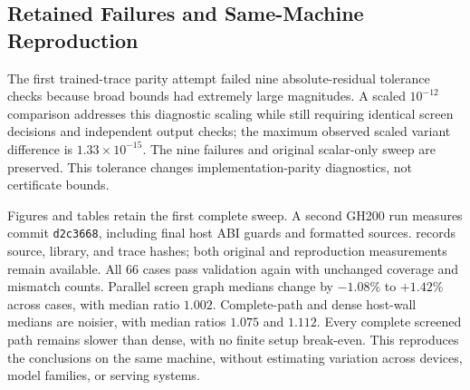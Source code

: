 \begin{minipage}{\textwidth}
\subsection{Retained Failures and Same-Machine Reproduction}
\label{sec:gh200-reproduction}

The first trained-trace parity attempt failed nine absolute-residual tolerance
checks because broad bounds had extremely large magnitudes. A scaled
$10^{-12}$ comparison addresses this diagnostic scaling while still requiring
identical screen decisions and independent output checks; the maximum observed
scaled variant difference is $1.33\times10^{-15}$. The nine failures and original
scalar-only sweep are preserved. This tolerance changes implementation-parity
diagnostics, not certificate bounds.

Figures and tables retain the first complete sweep. A second GH200 run measures
commit \texttt{d2c3668}, including final host ABI guards and formatted sources.
 records source, library, and trace hashes;
both original and reproduction measurements remain available. All 66 cases
pass validation again with unchanged coverage and mismatch counts. Parallel
screen graph medians change by $-1.08\%$ to $+1.42\%$ across cases, with median
ratio $1.002$. Complete-path and dense host-wall medians are noisier, with
median ratios $1.075$ and $1.112$. Every complete screened path remains slower
than dense, with no finite setup break-even. This reproduces the conclusions
on the same machine, without estimating variation across devices, model
families, or serving systems.
\par
\end{minipage}

\FloatBarrier
